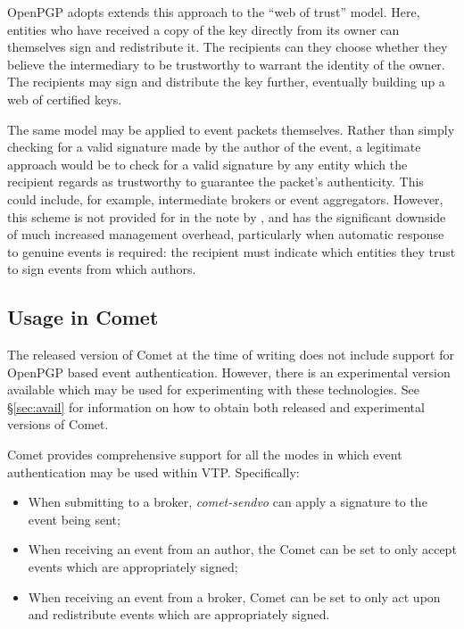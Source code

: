 \documentclass[5p,authoryear]{elsarticle}
\begin{document}
OpenPGP adopts extends this approach to the ``web of trust'' model. Here,
entities who have received a copy of the key directly from its owner can
themselves sign and redistribute it. The recipients can they choose whether
they believe the intermediary to be trustworthy to warrant the identity of the
owner. The recipients may sign and distribute the key further, eventually
building up a web of certified keys.

The same model may be applied to event packets themselves. Rather than simply
checking for a valid signature made by the author of the event, a legitimate
approach would be to check for a valid signature by any entity which the
recipient regards as trustworthy to guarantee the packet's authenticity. This
could include, for example, intermediate brokers or event aggregators.
However, this scheme is not provided for in the note by
\citeauthor{Denny:2008}, and has the significant downside of much increased
management overhead, particularly when automatic response to genuine events is
required: the recipient must indicate which entities they trust to sign events
from which authors.

\subsection{Usage in Comet}

The released version of Comet at the time of writing does not include support
for OpenPGP based event authentication. However, there is an experimental
version available which may be used for experimenting with these technologies.
See \S\ref{sec:avail} for information on how to obtain both released and
experimental versions of Comet.

Comet provides comprehensive support for all the modes in which event
authentication may be used within VTP\@. Specifically:

\begin{itemize}

  \item{When submitting to a broker, \textit{comet-sendvo} can apply a
  signature to the event being sent;}

  \item{When receiving an event from an author, the Comet can be set to
  only accept events which are appropriately signed;}

  \item{When receiving an event from a broker, Comet can be set to only act
  upon and redistribute events which are appropriately signed.}

\end{itemize}
\end{document}
